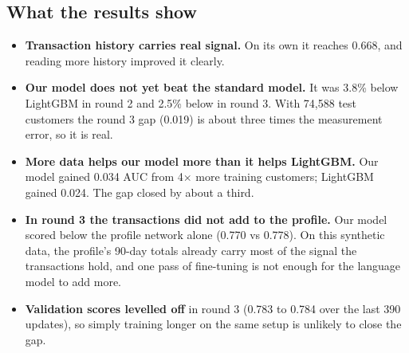 \documentclass[10pt,a4paper]{article}
\begin{document}
\subsection{What the results show}
\begin{itemize}
\item \textbf{Transaction history carries real signal.} On its own it reaches 0.668, and reading more history improved it clearly.
\item \textbf{Our model does not yet beat the standard model.} It was 3.8\% below LightGBM in round 2 and 2.5\% below in round 3. With 74,588 test customers the round 3 gap (0.019) is about three times the measurement error, so it is real.
\item \textbf{More data helps our model more than it helps LightGBM.} Our model gained 0.034 AUC from 4$\times$ more training customers; LightGBM gained 0.024. The gap closed by about a third.
\item \textbf{In round 3 the transactions did not add to the profile.} Our model scored below the profile network alone (0.770 vs 0.778). On this synthetic data, the profile's 90-day totals already carry most of the signal the transactions hold, and one pass of fine-tuning is not enough for the language model to add more.
\item \textbf{Validation scores levelled off} in round 3 (0.783 to 0.784 over the last 390 updates), so simply training longer on the same setup is unlikely to close the gap.
\end{itemize}

\end{document}
